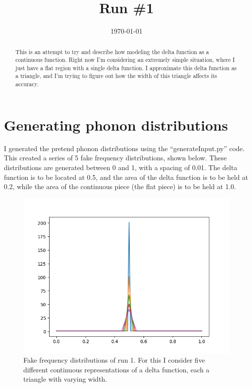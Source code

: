 \documentclass[a4paper]{article}
\title{Run \#1}
\date{\today}
\begin{document}
\maketitle

\begin{abstract}
This is an attempt to try and describe how modeling the delta function as a continuous function. Right now I'm considering an extremely simple situation, where I just have a flat region with a single delta function. I approximate this delta function as a triangle, and I'm trying to figure out how the width of this triangle affects its accuracy.
\end{abstract}


\section{Generating phonon distributions}
I generated the pretend phonon distributions using the ``generateInput.py'' code. This created a series of 5 fake frequency distributions, shown below. These distributions are generated between 0 and 1, with a spacing of 0.01. The delta function is to be located at 0.5, and the area of the delta function is to be held at 0.2, while the area of the continuous piece (the flat piece) is to be held at 1.0. 

\begin{figure}
\centering
\includegraphics[width=1.0\textwidth]{phononDist_run1}
\caption{\label{fig:run1}Fake frequency distributions of run 1. For this I consider five different continuous representations of a delta function, each a triangle with varying width. }
\end{figure}
\end{document}
